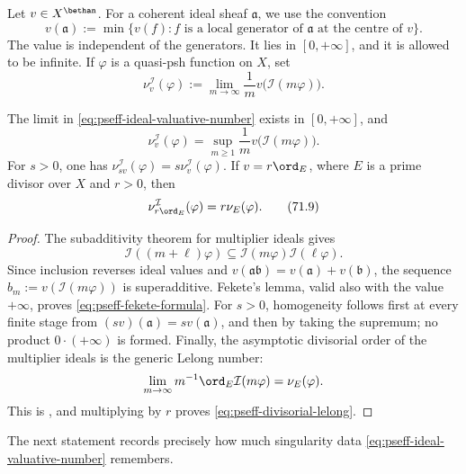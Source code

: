 Let \(v\in X^{\bethan}\).  For a coherent ideal sheaf \(\mathfrak a\),
we use the convention
\[
 v(\mathfrak a):=\min\{v(f):f\text{ is a local generator of }
 \mathfrak a\text{ at the centre of }v\}.
\tag{71.6}\label{eq:pseff-ideal-value}
\]
The value is independent of the generators.  It lies in
\([0,+\infty]\), and it is allowed to be infinite.  If \(\varphi\) is a
quasi-psh function on \(X\), set
\[
 \nu_v^{\mathcal I}(\varphi)
 :=\lim_{m\to\infty}\frac{1}{m}
      v\bigl(\mathcal I(m\varphi)\bigr).
\tag{71.7}\label{eq:pseff-ideal-valuative-number}
\]

\begin{proposition}\label{prop:pseff-ideal-valuative-basic}
The limit in \eqref{eq:pseff-ideal-valuative-number} exists in
\([0,+\infty]\), and
\[
 \nu_v^{\mathcal I}(\varphi)
 =\sup_{m\geq1}\frac{1}{m}
      v\bigl(\mathcal I(m\varphi)\bigr).
\tag{71.8}\label{eq:pseff-fekete-formula}
\]
For \(s>0\), one has
\(\nu_{sv}^{\mathcal I}(\varphi)=s\nu_v^{\mathcal I}(\varphi)\).  If
\(v=r\ord_E\), where \(E\) is a prime divisor over \(X\) and
\(r>0\), then
\[
             \nu_{r\ord_E}^{\mathcal I}(\varphi)
             =r\nu_E(\varphi).
\tag{71.9}\label{eq:pseff-divisorial-lelong}
\]
\end{proposition}

\begin{proof}
The subadditivity theorem for multiplier ideals gives
\[
 \mathcal I((m+\ell)\varphi)
 \subseteq\mathcal I(m\varphi)\mathcal I(\ell\varphi).
\tag{71.10}\label{eq:pseff-multiplier-subadditivity}
\]
Since inclusion reverses ideal values and \(v(\mathfrak a\mathfrak b)
=v(\mathfrak a)+v(\mathfrak b)\), the sequence
\(b_m:=v(\mathcal I(m\varphi))\) is superadditive.  Fekete's lemma,
valid also with the value \(+\infty\), proves
\eqref{eq:pseff-fekete-formula}.  For \(s>0\), homogeneity follows first at
every finite stage from \((sv)(\mathfrak a)=s v(\mathfrak a)\), and then by
taking the supremum; no product \(0\cdot(+\infty)\) is formed.  Finally, the
asymptotic divisorial order of the
multiplier ideals is the generic Lelong number:
\[
 \lim_{m\to\infty}m^{-1}\ord_E\mathcal I(m\varphi)
 =\nu_E(\varphi).
\]
This is \cite[Lemma~B.4]{BBJ21}, and multiplying by \(r\) proves
\eqref{eq:pseff-divisorial-lelong}.
\end{proof}

The next statement records precisely how much singularity data
\eqref{eq:pseff-ideal-valuative-number} remembers.

